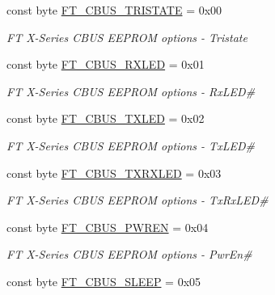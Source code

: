 \begin{DoxyCompactItemize}
\item 
const byte \mbox{\hyperlink{class_f_t_d2_x_x___n_e_t_1_1_f_t_d_i_1_1_f_t___x_s_e_r_i_e_s___c_b_u_s___o_p_t_i_o_n_s_a884644a131411088fcde646284b7d684}{F\+T\+\_\+\+C\+B\+U\+S\+\_\+\+T\+R\+I\+S\+T\+A\+TE}} = 0x00
\begin{DoxyCompactList}\small\item\em FT X-\/\+Series C\+B\+US E\+E\+P\+R\+OM options -\/ Tristate \end{DoxyCompactList}\item 
const byte \mbox{\hyperlink{class_f_t_d2_x_x___n_e_t_1_1_f_t_d_i_1_1_f_t___x_s_e_r_i_e_s___c_b_u_s___o_p_t_i_o_n_s_a47481fcd06dc7404d2cbb5a7d49eb14e}{F\+T\+\_\+\+C\+B\+U\+S\+\_\+\+R\+X\+L\+ED}} = 0x01
\begin{DoxyCompactList}\small\item\em FT X-\/\+Series C\+B\+US E\+E\+P\+R\+OM options -\/ Rx\+L\+ED\# \end{DoxyCompactList}\item 
const byte \mbox{\hyperlink{class_f_t_d2_x_x___n_e_t_1_1_f_t_d_i_1_1_f_t___x_s_e_r_i_e_s___c_b_u_s___o_p_t_i_o_n_s_a754645fa2a4e0308529121235939b3d7}{F\+T\+\_\+\+C\+B\+U\+S\+\_\+\+T\+X\+L\+ED}} = 0x02
\begin{DoxyCompactList}\small\item\em FT X-\/\+Series C\+B\+US E\+E\+P\+R\+OM options -\/ Tx\+L\+ED\# \end{DoxyCompactList}\item 
const byte \mbox{\hyperlink{class_f_t_d2_x_x___n_e_t_1_1_f_t_d_i_1_1_f_t___x_s_e_r_i_e_s___c_b_u_s___o_p_t_i_o_n_s_a06bfc8e0ecac73a0afb9eb74ec8b24c2}{F\+T\+\_\+\+C\+B\+U\+S\+\_\+\+T\+X\+R\+X\+L\+ED}} = 0x03
\begin{DoxyCompactList}\small\item\em FT X-\/\+Series C\+B\+US E\+E\+P\+R\+OM options -\/ Tx\+Rx\+L\+ED\# \end{DoxyCompactList}\item 
const byte \mbox{\hyperlink{class_f_t_d2_x_x___n_e_t_1_1_f_t_d_i_1_1_f_t___x_s_e_r_i_e_s___c_b_u_s___o_p_t_i_o_n_s_af966bcb08b14abeba69478425986b0e3}{F\+T\+\_\+\+C\+B\+U\+S\+\_\+\+P\+W\+R\+EN}} = 0x04
\begin{DoxyCompactList}\small\item\em FT X-\/\+Series C\+B\+US E\+E\+P\+R\+OM options -\/ Pwr\+En\# \end{DoxyCompactList}\item 
const byte \mbox{\hyperlink{class_f_t_d2_x_x___n_e_t_1_1_f_t_d_i_1_1_f_t___x_s_e_r_i_e_s___c_b_u_s___o_p_t_i_o_n_s_ad24fa78e259183f08fdc3f2bda66467e}{F\+T\+\_\+\+C\+B\+U\+S\+\_\+\+S\+L\+E\+EP}} = 0x05

\end{DoxyCompactItemize}
